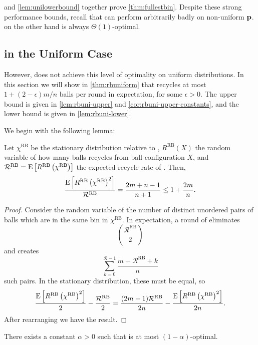  and \cref{lem:unilowerbound} together prove
\cref{thm:fullestbin}. Despite these strong performance bounds, recall that \FB
can perform arbitrarily badly on non-uniform $\mathbf{p}$. \RB on the other hand is
always $\Theta(1)$-optimal.

\subsection{\RB in the Uniform Case}

However, \RB{} does not achieve this level of optimality on uniform
distributions. In this section we will show in \cref{thm:rbuniform} that \RB
recycles at most $1+(2-\epsilon)m/n$ balls per round in expectation, for some
$\epsilon > 0$.  The upper bound is given in \cref{lem:rbuni-upper} and
\cref{cor:rbuni-upper-constants}, and the lower bound is given in
\cref{lem:rbuni-lower}.

We begin with the following lemma:

\begin{lemma}\label{lem:pair-flow}
	Let $\chi^\textrm{RB}$ be the stationary distribution relative to \RB,
	$R^\textrm{RB}(X)$ the random variable of how many balls \RB recycles from
	ball configuration $X$, and $\mathcal{R}^\textrm{RB} =
	\mathrm{E}\left[R^\textrm{RB}\left(\chi^\textrm{RB}\right)\right]$ the expected recycle rate
	of \RB. Then,
	\[ \frac{\mathrm{E}\left[R^\textrm{RB}\left(\chi^\textrm{RB}\right)^2\right]}{\mathcal{R}^\textrm{RB}} = \frac{2m+n-1}{n+1} \leq 1 + \frac{2m}{n}. \]
\end{lemma}

\begin{proof}
	Consider the random variable of the number of distinct unordered pairs of
	balls which are in the same bin in $\chi^\textrm{RB}$. In expectation, a
	round of \RB eliminates 
	\[\binom{\mathcal{R}^\textrm{RB}}{2}\]
	and creates
	\[\sum_{k=0}^{\mathcal{R} - 1} \frac{m - \mathcal{R}^\textrm{RB} + k}{n}\]
	such pairs. In the stationary distribution, these must be equal, so
        \[ \frac{\mathrm{E}\left[R^\textrm{RB}\left(\chi^\textrm{RB}\right)^2\right]}{2} - \frac{\mathcal{R}^\textrm{RB}}{2} = \frac{(2m-1)\mathcal{R}^\textrm{RB}}{2n} - \frac{\mathrm{E}\left[R^\textrm{RB}\left(\chi^\textrm{RB}\right)^2\right]}{2n}.\]
	After rearranging we have the result.
\end{proof}

\begin{lemma}\label{lem:rbuni-upper}
	There exists a constant $\alpha > 0$ such that \RB is at most
	$(1-\alpha)$-optimal.
\end{lemma}

